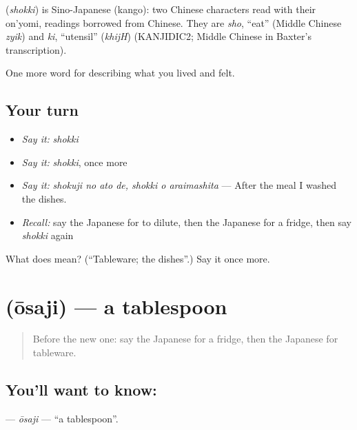 \begin{cousinweb}
\textbf{} (\emph{shokki}) is Sino-Japanese (kango): two Chinese characters read with their on'yomi, readings borrowed from Chinese. They are \emph{sho}, \textquotedblleft{}eat\textquotedblright{} (Middle Chinese \emph{zyik}) and \emph{ki}, \textquotedblleft{}utensil\textquotedblright{} (\emph{khijH}) (KANJIDIC2; Middle Chinese in Baxter's transcription).
\end{cousinweb}

\begin{grammarlens}[title={What you've built}]
One more word for describing what you lived and felt.
\end{grammarlens}

\subsection*{Your turn}
\begin{itemize}
\raggedright
  \item \emph{Say it:} \emph{shokki}
  \item \emph{Say it:} \emph{shokki}, once more
  \item \emph{Say it:} \emph{shokuji no ato de, shokki o araimashita} — After the meal I washed the dishes.
  \item \emph{Recall:} say the Japanese for to dilute, then the Japanese for a fridge, then say \emph{shokki} again
\end{itemize}

\begin{tcolorbox}[breakable,colback=teal!4,colframe=teal!35!black,title={Before you move on}]
What does  mean? (\textquotedblleft{}Tableware; the dishes\textquotedblright{}.) Say it once more.
\end{tcolorbox}
\section[\texorpdfstring{\ja{おおさじ} (ōsaji)}{おおさじ (ōsaji)}]{ (ōsaji) — a tablespoon}

\label{lesson:JA-C475-ousaji}



\begin{quote}
Before the new one: say the Japanese for a fridge, then the Japanese for tableware.
\end{quote}

\subsection*{You'll want to know: }
\textbf{} — \emph{ōsaji} — \textquotedblleft{}a tablespoon\textquotedblright{}.

